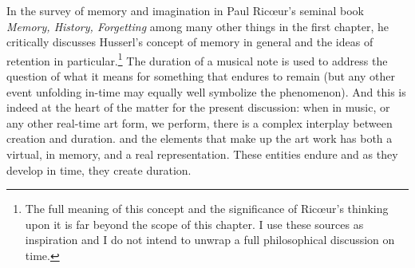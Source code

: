 In the survey of memory and imagination in Paul Ric{\oe}ur's seminal book \emph{Memory, History, Forgetting} among many other things in the first chapter, he critically discusses Husserl's concept of memory in general and the ideas of retention in particular.\footnote{The full meaning of this concept and the significance of Ric{\oe}ur's thinking upon it is far beyond the scope of this chapter. I use these sources as inspiration and I do not intend to unwrap a full philosophical discussion on time.} The duration of a musical note is used to address the question of what it means for something that endures to remain (but any other event unfolding in-time may equally well symbolize the phenomenon). And this is indeed at the heart of the matter for the present discussion: when in music, or any other real-time art form, we perform, there is a complex interplay between creation and duration. %
and the elements that make up the art work has both a virtual, in memory, and a real representation. These entities endure and as they develop in time, they create duration.

